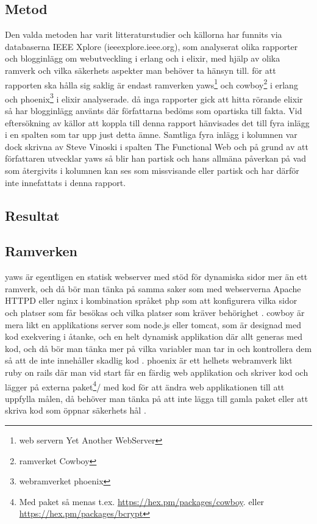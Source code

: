 \documentclass[12pt]{article}
\begin{document}
\subsection{ Metod}
Den valda metoden har varit 
litteraturstudier och källorna har funnits
 via databaserna IEEE Xplore 
 (ieeexplore.ieee.org), 
 som analyserat olika rapporter och 
blogginlägg om webutveckling i erlang och i elixir, med hjälp av olika ramverk och vilka säkerhets aspekter man behöver ta hänsyn till. för att rapporten ska hålla sig 
saklig är endast ramverken yaws\footnote{web servern Yet Another WebServer\cite{yawsorg}} och cowboy\footnote{ramverket Cowboy\cite{cowboyorg}} i erlang och phoenix\footnote{webramverket phoenix\cite{phoenixorg}} i elixir analyserade. då inga rapporter gick att hitta rörande elixir så har blogginlägg använts där författarna bedöms som opartiska till fakta. Vid eftersökning av källor att koppla till denna rapport hänvisades det till fyra inlägg 
i en spalten som tar upp just detta ämne. Samtliga fyra inlägg i kolumnen var dock skrivna av Steve Vinoski i spalten The Functional Web och på grund av att författaren utvecklar yaws så blir han partisk och hans allmäna påverkan på vad som återgivits i kolumnen kan ses som missvisande eller partisk och har därför inte innefattats i denna rapport.

\subsection{ Resultat}
\subsection*{Ramverken}
yaws är egentligen en statisk webserver med stöd för dynamiska sidor mer än ett ramverk, och då bör man tänka på samma saker som med webserverna Apache HTTPD eller nginx i kombination språket php som att konfigurera vilka sidor och platser som får besökas och vilka platser som kräver behörighet \cite{yaws}. cowboy är mera likt en applikations server som node.js eller tomcat, som är designad med kod exekvering i åtanke, och en helt dynamisk applikation där allt generas med kod, och då bör man tänka mer på vilka variabler man tar in och kontrollera dem så att de inte innehåller skadlig kod \cite{cowboy}. phoenix är ett helhets webramverk likt ruby on rails där man vid start får en färdig web applikation och skriver kod och lägger på externa paket\footnote{Med paket så menas t.ex. \url{https://hex.pm/packages/cowboy}.
eller \url{https://hex.pm/packages/bcrypt}}/ med kod för att ändra web applikationen till att uppfylla målen, då behöver man tänka på att inte lägga till gamla paket eller att skriva kod som öppnar säkerhets hål \cite{phoenix/ruby,phoenix/rails,phoenix}.
\end{document}
